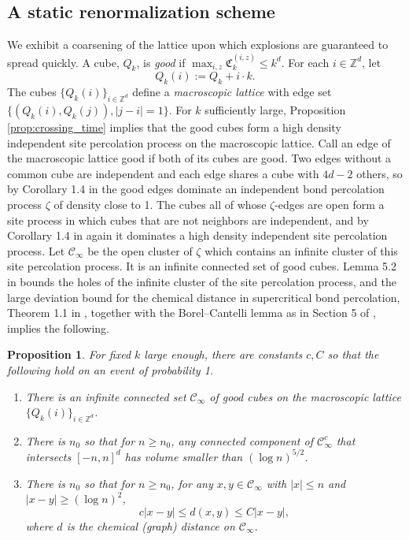 \documentclass[aap]{imsart}
\newcommand{\Z}{\mathbb{Z}}
\newtheorem{prop}{Proposition}[section]
\begin{document}
\subsection{A static renormalization scheme}
We exhibit a coarsening of the lattice upon which explosions are guaranteed to spread quickly. A cube, $Q_k$, is {\it good} if 
$\max_{i,z} \mathfrak{C}_{k}^{(i,z)} \leq k^d$. For each $i \in \Z^d$, let 
\begin{equation} 
Q_k(i) := Q_k + i \cdot k.
\end{equation}
The cubes $\{Q_k(i)\}_{i \in \Z^d}$ define a {\it macroscopic lattice} with edge set $\{ (Q_k(i), Q_k(j)), |j-i| = 1\}$. 
For $k$ sufficiently large, Proposition \ref{prop:crossing_time} implies that the good cubes form a high density independent site percolation process on the macroscopic lattice. Call an edge of the macroscopic lattice good if both of its cubes are good. Two edges without a common cube are independent and each edge shares a cube with $4d - 2$ others, so by Corollary 1.4 in \cite{liggett1997domination} the good edges dominate an independent bond percolation process $\zeta$ of density close to 1. The cubes all of whose $\zeta$-edges are open form a site process in which cubes that are not neighbors are independent, and by Corollary 1.4 in \cite{liggett1997domination} again it dominates a high density independent site percolation process. Let $\mathcal{C}_{\infty}$ be the open cluster of $\zeta$ which contains an infinite cluster of this site percolation process. It is an infinite connected set of good cubes. Lemma 5.2 in \cite{mathieu2008quenched} bounds the holes of the infinite cluster of the site percolation process, and the large deviation bound for the chemical distance in supercritical bond percolation, Theorem 1.1 in \cite{antal1996chemical}, together with the Borel--Cantelli lemma as in Section 5 of \cite{mathieu2008quenched}, implies the following.



\begin{prop} \label{prop:renormalization_properties}
	For fixed $k$ large enough, there are constants $c, C$ so that the following hold
	on an event of probability 1. 
	\begin{enumerate}
		\item There is an infinite connected set $\mathcal{C}_{\infty}$ of good cubes
		on the macroscopic lattice $\{Q_k(i)\}_{i \in \Z^d}$. 
		\item	There is $n_0$ so that for $n \geq n_0$, any connected
		component of $\mathcal{C}_{\infty}^c$ that intersects $[-n,n]^d$ has volume 
		smaller than $(\log n)^{5/2}$.
		\item   There is $n_0$ so that for $n \geq n_0$, for any $x,y \in \mathcal{C}_{\infty}$ with $|x| \leq n$ and $|x-y| \geq (\log n)^2$, 
		\[
		c |x-y| \leq d(x,y) \leq C |x-y|,  
		\] 
		where $d$ is the chemical (graph) distance on $\mathcal{C}_{\infty}$.
	\end{enumerate}
\end{prop}
\end{document}
